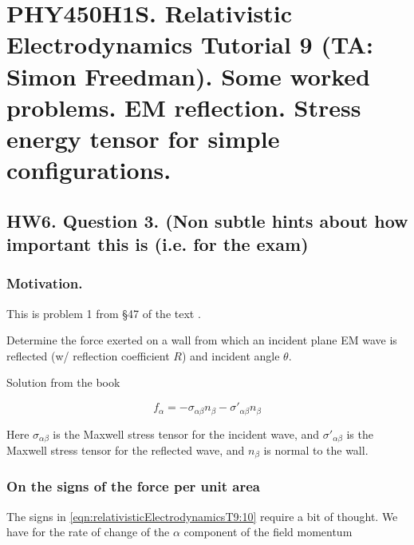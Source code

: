 
%

\chapter{PHY450H1S.  Relativistic Electrodynamics Tutorial 9 (TA: Simon Freedman).  Some worked problems.  EM reflection.  Stress energy tensor for simple configurations.}
\label{chap:relativisticElectrodynamicsT9}
{}
\date{Mar 30, 2011}

\beginArtWithToc

\section{HW6. Question 3. (Non subtle hints about how important this is (i.e. for the exam)}

\subsection{Motivation.}

This is problem 1 from \S 47 of the text \cite{landau1980classical}.

Determine the force exerted on a wall from which an incident plane EM wave is reflected (w/ reflection coefficient $R$) and incident angle $\theta$.

Solution from the book

\begin{equation}\label{eqn:relativisticElectrodynamicsT9:10}
f_\alpha = - \sigma_{\alpha \beta} n_\beta - {\sigma'}_{\alpha \beta} n_\beta
\end{equation}

Here $\sigma_{\alpha \beta}$ is the Maxwell stress tensor for the incident wave, and ${\sigma'}_{\alpha \beta}$ is the Maxwell stress tensor for the reflected wave, and $n_\beta$ is normal to the wall.

\subsection{On the signs of the force per unit area}

The signs in \ref{eqn:relativisticElectrodynamicsT9:10} require a bit of thought.  We have for the rate of change of the $\alpha$ component of the field momentum

